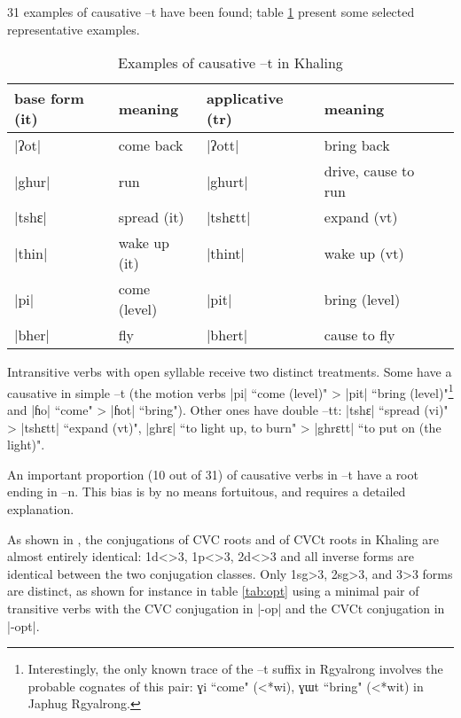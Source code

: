\documentclass[oldfontcommands,oneside,a4paper,11pt]{article}
\newcommand{\ipa}[1]{{\phon #1}} %
\begin{document}
31 examples of causative \ipa{--t} have been found; table \ref{tab:caus} present some selected representative examples.

\begin{table}[H]
\caption{Examples of causative \ipa{--t} in Khaling} \label{tab:caus}
\begin{tabular}{lllll}
\toprule
base form (it) & meaning & applicative (tr) & meaning \\
\midrule
|ʔot| & come back & |ʔott| &bring back\\
|ghur| & run & |ghurt| &drive, cause to run\\
|tshɛ| & spread (it) & |tshɛtt| & expand (vt)\\
|thin| & wake up (it) & |thint| &wake up (vt)\\
|pi| & come (level) & |pit| &bring (level)\\
|bher| & fly & |bhert| &cause to fly\\
\bottomrule
\end{tabular}
\end{table}
Intransitive verbs with open syllable receive two distinct treatments. Some have a causative in simple \ipa{--t} (the motion verbs |pi| ``come (level)" > |pit| ``bring (level)"\footnote{Interestingly, the only known trace of the \ipa{--t} suffix in Rgyalrong involves the probable cognates of this pair: \ipa{ɣi} ``come" (<*wi), \ipa{ɣɯt} ``bring" (<*wit) in Japhug Rgyalrong.} and |ɦo| ``come" > |ɦot| ``bring"). Other ones have double \ipa{--tt}: |tshɛ| ``spread (vi)" > |tshɛtt| ``expand (vt)", |ghrɛ| ``to light up, to burn" > |ghrɛtt| ``to put on (the light)".

An important proportion (10 out of 31) of causative verbs in \ipa{--t} have a root ending in \ipa{--n}. This bias is by no means fortuitous, and requires a detailed explanation.

As shown in \citet{jacques12khaling}, the conjugations of CVC roots and of CVCt roots in Khaling are almost entirely identical: 1d<>3, 1p<>3, 2d<>3 and all inverse forms are identical between the two conjugation classes. Only 1sg>3, 2sg>3, and 3>3 forms are distinct, as shown for instance in table \ref{tab:opt} using a minimal pair of transitive verbs with  the CVC conjugation in |-op| and the CVCt conjugation in |-opt|.
\end{document}
